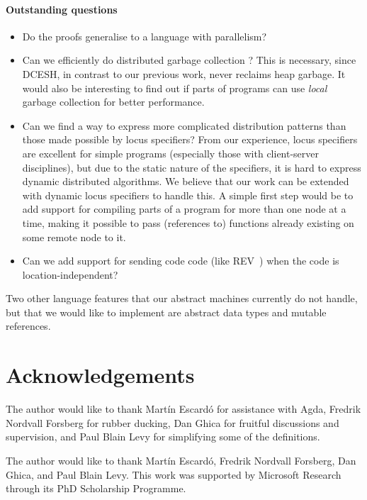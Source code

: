 \documentclass{article}
\theoremstyle{definition}
\newcommand{\DCESHn}{DCESH}
\begin{document}
\paragraph*{Outstanding questions}
\begin{itemize}
  \item Do the proofs generalise to a language with parallelism?
  \item Can we efficiently do distributed garbage collection
  \cite{DBLP:conf/iwmm/PlainfosseS95}? This is necessary, since \DCESHn{}, in
  contrast to our previous work, never reclaims heap garbage. 
  \iffullversion
  It would also be interesting to find out if parts of programs can use
  \emph{local} garbage collection for better performance.
  \fi
  \item Can we find a way to express more complicated distribution patterns
  than those made possible by locus specifiers? From our experience, locus
  specifiers are excellent for simple programs (especially those with
  client-server disciplines), but due to the static nature of the specifiers,
  it is hard to express dynamic distributed algorithms.
  We believe that our work can be extended with dynamic locus specifiers to
  handle this.
  \iffullversion
  A simple first step would be to add support for compiling parts of a program
  for more than one node at a time, making it possible to pass (references to)
  functions already existing on some remote node to it.
  \item Can we add support for sending code code (like
  REV~\cite{DBLP:journals/toplas/StamosG90}) when the code is location-independent?
  \fi
\end{itemize}
\iffullversion
Two other language features that our abstract machines currently do not handle,
but that we would like to implement are abstract data types and mutable
references.
\fi

\section*{Acknowledgements}
\iffullversion
The author would like to thank
Mart\'{i}n Escard\'{o} for assistance with Agda,
Fredrik Nordvall Forsberg for rubber ducking,
Dan Ghica for fruitful discussions and supervision,
and Paul Blain Levy for simplifying some of the definitions.

\else
The author would like to thank
Mart\'{i}n Escard\'{o},
Fredrik Nordvall Forsberg,
Dan Ghica,
and Paul Blain Levy.
\fi
This work was supported by Microsoft Research through its PhD Scholarship
Programme.




\iffullversion

\else

\fi
\end{document}
